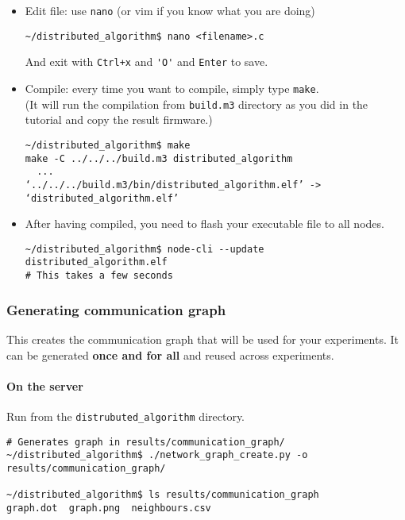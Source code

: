 \documentclass{article}
\begin{document}
\begin{itemize}

\item Edit file: use \verb=nano= (or vim if you know what you are doing)
    \begin{verbatim}~/distributed_algorithm$ nano <filename>.c\end{verbatim}
    And exit with \verb=Ctrl+x= and \verb='O'= and \verb=Enter= to save.

\item Compile: every time you want to compile, simply type \verb=make=.\\
    (It will run the compilation from \verb=build.m3= directory as you did in the tutorial and copy the result firmware.)
    \begin{verbatim}~/distributed_algorithm$ make
make -C ../../../build.m3 distributed_algorithm
  ...
‘../../../build.m3/bin/distributed_algorithm.elf’ -> ‘distributed_algorithm.elf’
\end{verbatim}

\item After having compiled, you need to flash your executable file to all nodes.
    \begin{verbatim}~/distributed_algorithm$ node-cli --update distributed_algorithm.elf
# This takes a few seconds
\end{verbatim}

\end{itemize}

\subsubsection{Generating communication graph}

This creates the communication graph that
will be used for your experiments. It can be generated \textbf{once and for all} and
reused across experiments.

\paragraph{On the server}

Run from the \verb=distrubuted_algorithm= directory.

\begin{verbatim}# Generates graph in results/communication_graph/
~/distributed_algorithm$ ./network_graph_create.py -o results/communication_graph/

~/distributed_algorithm$ ls results/communication_graph
graph.dot  graph.png  neighbours.csv \end{verbatim}
\end{document}
